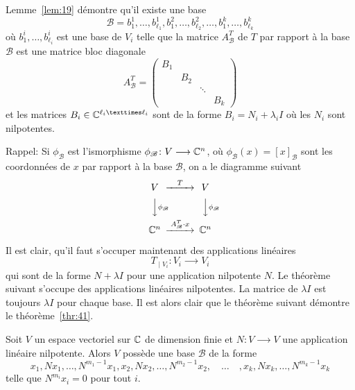 \begin{remark}
  \label{rem:3}
  Lemme~\ref{lem:19} démontre qu'il existe une base 
  \begin{displaymath}
  \mathscr{B} =   b_1^1,\dots,b_{\ell_1}^1,b_1^2,\dots,b_{\ell_2}^2,\dots,b_1^k,\dots,b_{\ell_k}^k
  \end{displaymath}
  où $b_1^i,\dots,b_{\ell_i}^i$ est une base de $V_i$ telle que la matrice $A^T_\mathscr{B}$ de $T$ par rapport à la base $\mathscr{B}$ est une matrice bloc diagonale 
  \begin{displaymath}
      A^T_{\mathscr{B} }  =
      \begin{pmatrix}
        B_1 \\
        & B_2 \\
        & & \ddots \\
        & &  & B_k
      \end{pmatrix}
  \end{displaymath}
et les matrices $B_i \in \C^{\ell_i × \ell_i}$ sont de la forme $B_i = N_i + λ_i I$ où les $N_i$ sont  nilpotentes. 

Rappel: Si  $\phi_{\mathscr{B}}$ est l'ismorphisme $\phi_{\mathscr{B}} \colon V \longrightarrow \mathbb{C}^n$, où $\phi_{\mathscr{B}}(x) = [x]_{\mathscr{B}}$ sont les coordonnées de $x$ par rapport à la base ${\mathscr{B}}$,  on a le diagramme suivant 
\begin{displaymath}
  {
  \begin{CD}
    V     @>T>>  V\\
    @VV \phi_{\mathscr{B}} V        @VV \phi_{\mathscr{B}} V\\ 
    \C^n     @>A^T_{\mathscr{B}} \cdot x>>  \C^n
  \end{CD}} 
\end{displaymath} 
\end{remark}

Il est clair, qu'il faut s'occuper maintenant des applications linéaires 
\begin{displaymath}
  T_{∣V_i} \colon V_i ⟶ V_i 
\end{displaymath}
qui sont de la forme $N + λ I$ pour une application nilpotente $N$. Le théorème suivant s'occupe des applications linéaires nilpotentes. La matrice de $λI$ est toujours $λ I$ pour chaque base. Il est alors clair que le théorème suivant démontre le théorème~\ref{thr:41}. 

\begin{theorem}
  \label{thr:38}
  Soit $V$ un espace vectoriel sur $\mathbb{C}$ de dimension finie et $N\colon V ⟶V$  une application linéaire nilpotente.  Alors $V$ possède une base $ℬ$ de la forme 
  \begin{displaymath}
    x_1,Nx_1, \dots, N^{m_1-1}x_1, x_2,Nx_2, \ldots , N^{m_2-1}x_2, \quad \dots \quad , x_k,Nx_k, \dots, N^{m_k-1}x_k
  \end{displaymath}
telle que $N^{m_i}x_i = 0$ pour tout $i$. 
\end{theorem}


